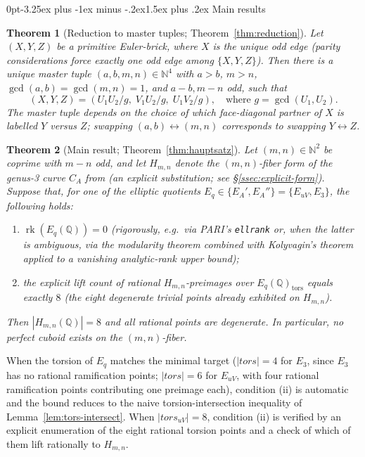 \documentclass[12pt,a4paper,reqno]{amsart}
\makeatletter
\renewcommand{\subsection}{\@startsection{subsection}{2}%
  {0pt}{-3.25ex plus -1ex minus -.2ex}{1.5ex plus .2ex}%
  {\normalfont\normalsize\bfseries}}
\theoremstyle{plain}
\newtheorem{theorem}{Theorem}[section]
\theoremstyle{definition}
\theoremstyle{remark}
\newcommand{\Q}{\mathbb{Q}}
\newcommand{\N}{\mathbb{N}}
\newcommand{\HC}{H_{m,n}}
\newcommand{\rk}{\operatorname{rk}}
\newcommand{\tors}{\mathrm{tors}}
\makeatother
\begin{document}
\subsection{Main results}

\begin{theorem}[Reduction to master tuples; Theorem~\ref{thm:reduction}]
Let $(X, Y, Z)$ be a primitive Euler-brick, where $X$ is the unique odd edge (parity considerations force exactly one odd edge among $\{X, Y, Z\}$). Then there is a unique master tuple $(a, b, m, n) \in \N^4$ with $a > b$, $m > n$, $\gcd(a,b) = \gcd(m,n) = 1$, and $a-b, m-n$ odd, such that
$$
(X, Y, Z) = (U_1 U_2 / g, \; V_1 U_2 / g, \; U_1 V_2 / g),
\quad \text{where } g = \gcd(U_1, U_2).
$$
The master tuple depends on the choice of which face-diagonal partner of $X$ is labelled $Y$ versus $Z$; swapping $(a,b) \leftrightarrow (m,n)$ corresponds to swapping $Y \leftrightarrow Z$.
\end{theorem}

\begin{theorem}[Main result; Theorem~\ref{thm:hauptsatz}]
Let $(m, n) \in \N^2$ be coprime with $m - n$ odd, and let $\HC$ denote the $(m, n)$-fiber form of the genus-3 curve $C_A$ from \cite[\S 3]{peschmann-paper1} (an explicit substitution; see \S\ref{ssec:explicit-form}). Suppose that, for one of the elliptic quotients $E_q \in \{E_A', E_A''\} = \{E_{uV}, E_3\}$, the following holds:
\begin{enumerate}[label=(\roman*),leftmargin=2em]
  \item $\rk(E_q(\Q)) = 0$ (rigorously, e.g.\ via PARI's \texttt{ellrank} or, when the latter is ambiguous, via the modularity theorem combined with Kolyvagin's theorem applied to a vanishing analytic-rank upper bound);
  \item the explicit lift count of rational $H_{m,n}$-preimages over $E_q(\Q)_\tors$ equals exactly $8$ (the eight degenerate trivial points already exhibited on $\HC$).
\end{enumerate}
Then $|\HC(\Q)| = 8$ and all rational points are degenerate. In particular, no perfect cuboid exists on the $(m, n)$-fiber.
\end{theorem}

When the torsion of $E_q$ matches the minimal target ($|tors| = 4$ for $E_3$, since $E_3$ has no rational ramification points; $|tors| = 6$ for $E_{uV}$, with four rational ramification points contributing one preimage each), condition (ii) is automatic and the bound reduces to the naive torsion-intersection inequality of Lemma~\ref{lem:tors-intersect}. When $|tors_{uV}| = 8$, condition (ii) is verified by an explicit enumeration of the eight rational torsion points and a check of which of them lift rationally to $\HC$.
\end{document}

